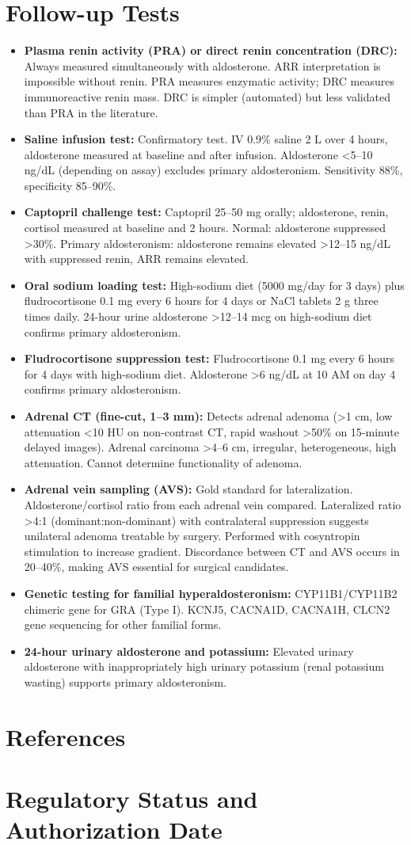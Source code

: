 \section*{Follow-up Tests}
\begin{itemize}
  \item \textbf{Plasma renin activity (PRA) or direct renin concentration (DRC):} Always measured simultaneously with aldosterone. ARR interpretation is impossible without renin. PRA measures enzymatic activity; DRC measures immunoreactive renin mass. DRC is simpler (automated) but less validated than PRA in the literature.
  \item \textbf{Saline infusion test:} Confirmatory test. IV 0.9\% saline 2 L over 4 hours, aldosterone measured at baseline and after infusion. Aldosterone <5--10 ng/dL (depending on assay) excludes primary aldosteronism. Sensitivity 88\%, specificity 85--90\%.
  \item \textbf{Captopril challenge test:} Captopril 25--50 mg orally; aldosterone, renin, cortisol measured at baseline and 2 hours. Normal: aldosterone suppressed >30\%. Primary aldosteronism: aldosterone remains elevated >12--15 ng/dL with suppressed renin, ARR remains elevated.
  \item \textbf{Oral sodium loading test:} High-sodium diet (5000 mg/day for 3 days) plus fludrocortisone 0.1 mg every 6 hours for 4 days or NaCl tablets 2 g three times daily. 24-hour urine aldosterone >12--14 mcg on high-sodium diet confirms primary aldosteronism.
  \item \textbf{Fludrocortisone suppression test:} Fludrocortisone 0.1 mg every 6 hours for 4 days with high-sodium diet. Aldosterone >6 ng/dL at 10 AM on day 4 confirms primary aldosteronism.
  \item \textbf{Adrenal CT (fine-cut, 1--3 mm):} Detects adrenal adenoma (>1 cm, low attenuation <10 HU on non-contrast CT, rapid washout >50\% on 15-minute delayed images). Adrenal carcinoma >4--6 cm, irregular, heterogeneous, high attenuation. Cannot determine functionality of adenoma.
  \item \textbf{Adrenal vein sampling (AVS):} Gold standard for lateralization. Aldosterone/cortisol ratio from each adrenal vein compared. Lateralized ratio >4:1 (dominant:non-dominant) with contralateral suppression suggests unilateral adenoma treatable by surgery. Performed with cosyntropin stimulation to increase gradient. Discordance between CT and AVS occurs in 20--40\%, making AVS essential for surgical candidates.
  \item \textbf{Genetic testing for familial hyperaldosteronism:} CYP11B1/CYP11B2 chimeric gene for GRA (Type I). KCNJ5, CACNA1D, CACNA1H, CLCN2 gene sequencing for other familial forms.
  \item \textbf{24-hour urinary aldosterone and potassium:} Elevated urinary aldosterone with inappropriately high urinary potassium (renal potassium wasting) supports primary aldosteronism.
\end{itemize}

\section*{References}



\clearpage
\section*{Regulatory Status and Authorization Date}

\clearpage
